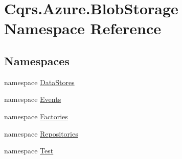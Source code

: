 \hypertarget{namespaceCqrs_1_1Azure_1_1BlobStorage}{}\section{Cqrs.\+Azure.\+Blob\+Storage Namespace Reference}
\label{namespaceCqrs_1_1Azure_1_1BlobStorage}
\subsection*{Namespaces}
\begin{DoxyCompactItemize}
\item 
namespace \hyperlink{namespaceCqrs_1_1Azure_1_1BlobStorage_1_1DataStores}{Data\+Stores}
\item 
namespace \hyperlink{namespaceCqrs_1_1Azure_1_1BlobStorage_1_1Events}{Events}
\item 
namespace \hyperlink{namespaceCqrs_1_1Azure_1_1BlobStorage_1_1Factories}{Factories}
\item 
namespace \hyperlink{namespaceCqrs_1_1Azure_1_1BlobStorage_1_1Repositories}{Repositories}
\item 
namespace \hyperlink{namespaceCqrs_1_1Azure_1_1BlobStorage_1_1Test}{Test}
\end{DoxyCompactItemize}
